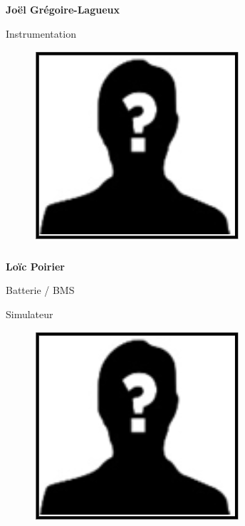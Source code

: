 \documentclass[a0paper,portrait]{baposter}
\begin{document}
\begin{poster}
{\subsubsection*{}
\vspace{2mm}
\textbf{Joël Grégoire-Lagueux}

Instrumentation

\begin{figure}
\includegraphics[width=.9\linewidth]{img/membres/membre_placeholder.png} 
\end{figure}
\subsubsection*{}
\vspace{-2mm}
\textbf{Loïc Poirier}

Batterie / BMS

Simulateur

\begin{figure}
\includegraphics[width=.9\linewidth]{img/membres/membre_placeholder.png} 
\end{figure}
}
\end{poster}
\end{document}
